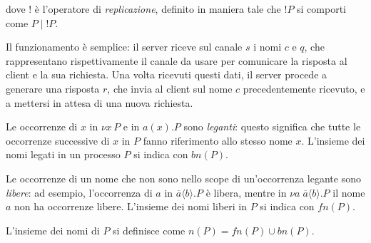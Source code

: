 dove $!$ \`e l'operatore di \emph{replicazione}, definito in maniera tale
che $!P$ si comporti come $P \; | \; !P$.

Il funzionamento \`e semplice: il server riceve sul canale $s$ i nomi $c$ e
$q$, che rappresentano rispettivamente il canale da usare per comunicare la
risposta al client e la sua richiesta. Una volta ricevuti questi dati, il
server procede a generare una risposta $r$, che invia al client sul nome $c$
precedentemente ricevuto, e a mettersi in attesa di una nuova richiesta.

Le occorrenze di $x$ in $\nu x \, P$ e in $ a(x).P$ sono \emph{leganti}:
questo significa che tutte le occorrenze successive di $x$ in $P$ fanno
riferimento allo stesso nome $x$. L'insieme dei nomi legati in un processo
$P$ si indica con $bn(P)$.

Le occorrenze di un nome che non sono nello scope di un'occorrenza legante
sono \emph{libere}: ad esempio, l'occorrenza di $a$ in
$\overline{a}\langle b\rangle.P$ \`e libera, mentre in
$\nu a \; \overline{a}\langle b\rangle.P$ il nome $a$ non ha occorrenze
libere. L'insieme dei nomi liberi in $P$ si indica con $fn(P)$.

L'insieme dei nomi di $P$ si definisce come $n(P) = fn(P) \cup bn(P)$.
